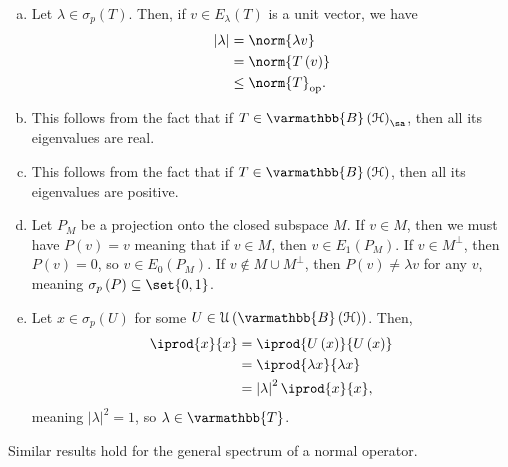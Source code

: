 \documentclass[10pt]{mypackage}
\renewcommand*{\mathbb}[1]{\varmathbb{#1}}
\newcommand{\B}{\mathbb{B}}
\begin{document}
\begin{solution}\hfill
  \begin{enumerate}[(a)]
    \item Let $\lambda\in \sigma_p\left(T\right)$. Then, if $v\in E_{\lambda}\left(T\right)$ is a unit vector, we have
      \begin{align*}
        \left\vert \lambda \right\vert &= \norm{\lambda v}\\
                                       &= \norm{T\left(v\right)}\\
                                       &\leq \norm{T}_{\text{op}}.
      \end{align*}
    \item This follows from the fact that if $T\in \B\left(\mathcal{H}\right)_{\sa}$, then all its eigenvalues are real.
    \item This follows from the fact that if $T\in \B\left(\mathcal{H}\right)$, then all its eigenvalues are positive.
    \item Let $P_M$ be a projection onto the closed subspace $M$. If $v\in M$, then we must have $P\left(v\right) = v$ meaning that if $v\in M$, then $v\in E_{1}\left(P_M\right)$. If $v\in M^{\perp}$, then $P\left(v\right) = 0$, so $v\in E_{0}\left(P_M\right)$. If $v\notin M\cup M^{\perp}$, then $P\left(v\right) \neq \lambda v$ for any $v$, meaning $\sigma_p\left(P\right) \subseteq \set{0,1}$.
    \item Let $x\in \sigma_p\left(U\right)$ for some $U\in \mathcal{U}\left(\B\left(\mathcal{H}\right)\right)$. Then,
      \begin{align*}
        \iprod{x}{x} &= \iprod{U\left(x\right)}{U\left(x\right)}\\
                     &= \iprod{\lambda x}{\lambda x}\\
                     &= \left\vert \lambda \right\vert^2 \iprod{x}{x},
      \end{align*}
      meaning $\left\vert \lambda \right\vert^2 = 1$, so $\lambda \in \mathbb{T}$.
  \end{enumerate}
\end{solution}
Similar results hold for the general spectrum of a normal operator.\newline
\end{document}
